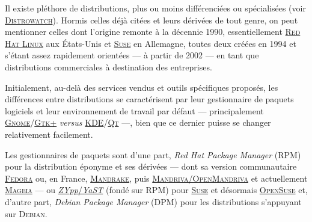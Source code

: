 %
Il existe pléthore de distributions, plus ou moins différenciées ou spécialisées (voir \href{https://distrowatch.com/}{\textsc{Distrowatch}}). Hormis celles déjà citées et leurs dérivées de tout genre, on peut mentionner celles dont l'origine remonte à la décennie 1990, essentiellement \href{https://www.redhat.com/fr}{\textsc{Red Hat Linux}} aux États-Unis et \href{https://www.suse.com/fr-fr/}{\textsc{Suse}} en Allemagne, toutes deux créées en 1994 et s'étant assez rapidement orientées --- à partir de 2002 --- en tant que distributions commerciales à destination des entreprises.%

Initialement, au-delà des services vendus et outils spécifiques proposés, les différences entre distributions se caractérisent par leur gestionnaire de paquets logiciels et leur environnement de travail par défaut --- principalement \href{https://www.gnome.org/}{\textsc{Gnome}}/\href{https://www.gtk.org/}{\textsc{Gtk+}} \textit{versus} \href{https://kde.org/}{\textsc{KDE}}/\href{https://www.qt.io/}{\textsc{Qt}} ---, bien que ce dernier puisse se changer relativement facilement.

Les gestionnaires de paquets sont d'une part, \textit{Red Hat Package Manager} (RPM) pour la distribution éponyme et ses dérivées --- dont sa version communautaire \href{https://getfedora.org/fr/}{\textsc{Fedora}} ou, en France, \href{https://fr.wikipedia.org/wiki/Mandriva_Linux}{\textsc{Mandrake}}, puis \href{https://www.openmandriva.org/}{\textsc{Mandriva/OpenMandriva}} et actuellement \href{https://fr.wikipedia.org/wiki/Mageia}{\textsc{Mageia}} --- ou \href{https://en.wikipedia.org/wiki/ZYpp}{\textit{ZYpp}/\textit{YaST}} (fondé sur RPM) pour \href{https://fr.wikipedia.org/wiki/SUSE}{\textsc{Suse}} et désormais \href{https://fr.opensuse.org/Portal:Projet}{\textsc{OpenSuse}} et, d'autre part, \textit{Debian Package Manager} (DPM) pour les distributions s'appuyant sur \textsc{Debian}.

